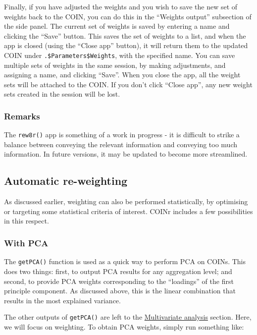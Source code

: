 \documentclass[
]{book}
\begin{document}
Finally, if you have adjusted the weights and you wish to save the new set of weights back to the COIN, you can do this in the ``Weights output'' subsection of the side panel. The current set of weights is saved by entering a name and clicking the ``Save'' button. This saves the set of weights to a list, and when the app is closed (using the ``Close app'' button), it will return them to the updated COIN under \texttt{.\$Parameters\$Weights}, with the specified name. You can save multiple sets of weights in the same session, by making adjustments, and assigning a name, and clicking ``Save''. When you close the app, all the weight sets will be attached to the COIN. If you don't click ``Close app'', any new weight sets created in the session will be lost.

\hypertarget{remarks}{%
\subsubsection{Remarks}\label{remarks}}

The \texttt{rew8r()} app is something of a work in progress - it is difficult to strike a balance between conveying the relevant information and conveying too much information. In future versions, it may be updated to become more streamlined.

\hypertarget{automatic-re-weighting}{%
\subsection{Automatic re-weighting}\label{automatic-re-weighting}}

As discussed earlier, weighting can also be performed statistically, by optimising or targeting some statistical criteria of interest. COINr includes a few possibilities in this respect.

\hypertarget{with-pca}{%
\subsubsection{With PCA}\label{with-pca}}

The \texttt{getPCA()} function is used as a quick way to perform PCA on COINs. This does two things: first, to output PCA results for any aggregation level; and second, to provide PCA weights corresponding to the ``loadings'' of the first principle component. As discussed above, this is the linear combination that results in the most explained variance.

The other outputs of \texttt{getPCA()} are left to the \protect\hyperlink{multivariate-analysis-1}{Multivariate analysis} section. Here, we will focus on weighting. To obtain PCA weights, simply run something like:
\end{document}
